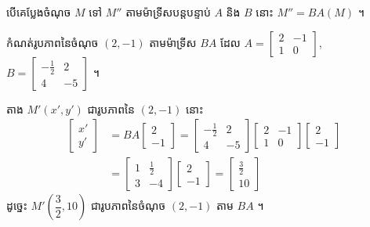 \begin{formulaBox}[ជាទូទៅ]
បើគេប្លែងចំណុច $M$ ទៅ $M''$ តាមម៉ាទ្រីសបន្តបន្ទាប់ $A$ និង $B$ នោះ $M'' = BA(M)$ ។
\end{formulaBox}

\begin{example}[លំហាត់គំរូ ១]
កំណត់រូបភាពនៃចំណុច $(2, -1)$ តាមម៉ាទ្រីស $BA$ ដែល $A = \begin{bmatrix} 2 & -1\\ 1 & 0 \end{bmatrix}$, $B = \begin{bmatrix} -\frac{1}{2} & 2\\ 4 & -5 \end{bmatrix}$ ។
\end{example}
\ans
តាង $M'(x', y')$ ជារូបភាពនៃ $(2, -1)$ នោះ
\[
\begin{aligned}
\begin{bmatrix} x'\\ y' \end{bmatrix} &= BA\begin{bmatrix} 2\\ -1 \end{bmatrix} = \begin{bmatrix} -\frac{1}{2} & 2\\ 4 & -5 \end{bmatrix}\begin{bmatrix} 2 & -1\\ 1 & 0 \end{bmatrix}\begin{bmatrix} 2\\ -1 \end{bmatrix}\\
&= \begin{bmatrix} 1 & \frac{1}{2}\\ 3 & -4 \end{bmatrix}\begin{bmatrix} 2\\ -1 \end{bmatrix} = \begin{bmatrix} \frac{3}{2}\\ 10 \end{bmatrix}
\end{aligned}
\]
ដូច្នេះ $M'\left(\dfrac{3}{2}, 10\right)$ ជារូបភាពនៃចំណុច $(2, -1)$ តាម $BA$ ។

